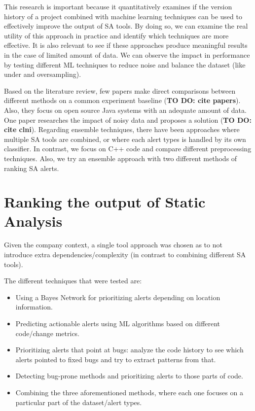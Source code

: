 \documentclass{article}
\begin{document}
This research is important because it quantitatively examines if the version history of a project combined with machine learning techniques can be used to effectively improve the output of SA tools. By doing so, we can examine the real utility of this approach in practice and identify which techniques are more effective. It is also relevant to see if these approaches produce meaningful results in the case of limited amount of data. We can observe the impact in performance by testing different ML techniques to reduce noise and balance the dataset (like under and oversampling). 

Based on the literature review, few papers make direct comparisons between different methods on a common experiment baseline (\textbf{TO DO: cite papers}). Also, they focus on open source Java systems with an adequate amount of data. One paper researches the impact of noisy data and proposes a solution (\textbf{TO DO: cite clni}). Regarding ensemble techniques, there have been approaches where multiple SA tools are combined, or where each alert types is handled by its own classifier. In contrast, we focus on C++ code and compare different preprocessing techniques. Also, we try an ensemble approach with two different methods of ranking SA alerts.

\section{Ranking the output of Static Analysis}


Given the company context, a single tool approach was chosen as to not introduce extra dependencies/complexity (in contrast to combining different SA tools). 

The different techniques that were tested are:
\begin{itemize}
    \item Using a Bayes Network for prioritizing alerts depending on location information.
    \item Predicting actionable alerts using ML algorithms based on different code/change metrics.
    \item Prioritizing alerts that point at bugs: analyze the code history to see which alerts pointed to fixed bugs and try to extract patterns from that.
    \item Detecting bug-prone methods and prioritizing alerts to those parts of code.
    \item Combining the three aforementioned methods, where each one focuses on a particular part of the dataset/alert types.
\end{itemize}
\end{document}
